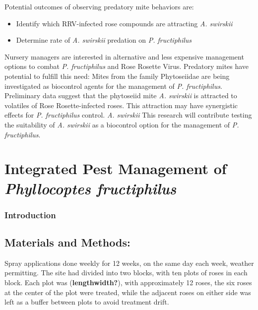 \documentclass[12pt,final,CPage]{ufthesis}
\begin{document}
{  Potential outcomes of observing predatory mite behaviors are:
  \begin{itemize}
  \item
    Identify which RRV-infected rose compounds are attracting \emph{A. swirskii}
  \item
    Determine rate of \emph{A. swirskii} predation on \emph{P. fructiphilus}
  \end{itemize}
  Nursery managers are interested in alternative and less expensive management options to combat \emph{P. fructiphilus} and Rose Rosette Virus. Predatory mites have potential to fulfill this need: Mites from the family Phytoseiidae are being investigated as biocontrol agents for the management of \emph{P. fructiphilus}. Preliminary data suggest that the phytoseiid mite \emph{A. swirskii} is attracted to volatiles of Rose Rosette-infected roses. This attraction may have synergistic effects for \emph{P. fructiphilus} control. \emph{A. swirskii} This research will contribute testing the suitability of \emph{A. swirskii} as a biocontrol option for the management of \emph{P. fructiphilus}.

  \hypertarget{integrated-pest-management-of-phyllocoptes-fructiphilus}{%
  \chapter{\texorpdfstring{Integrated Pest Management of \emph{Phyllocoptes fructiphilus}}{Integrated Pest Management of Phyllocoptes fructiphilus}}\label{integrated-pest-management-of-phyllocoptes-fructiphilus}}

  \hypertarget{introduction}{%
  \subsection{Introduction}\label{introduction}}

  \hypertarget{materials-and-methods}{%
  \section{Materials and Methods:}\label{materials-and-methods}}

  Spray applications done weekly for 12 weeks, on the same day each week, weather permitting.
  The site had divided into two blocks, with ten plots of roses in each block. Each plot was (\textbf{lengthwidth?}), with approximately 12 roses, the six roses at the center of the plot were treated, while the adjacent roses on either side was left as a buffer between plots to avoid treatment drift.

}
\end{document}

